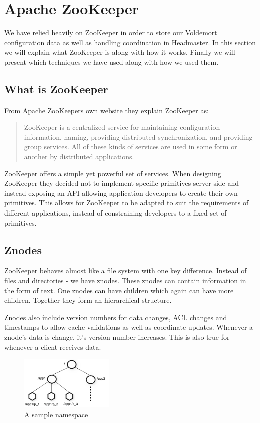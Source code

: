 \clearpage
\section{Apache ZooKeeper}
We have relied heavily on ZooKeeper in order to store our Voldemort configuration data as well as handling coordination in Headmaster. In this section we will explain what ZooKeeper is along with how it works. Finally we will present which techniques we have used along with how we used them. 

\subsection{What is ZooKeeper}
From Apache ZooKeepers own website\cite{zookeeper} they explain ZooKeeper as:

\blockquote{ZooKeeper is a centralized service for maintaining configuration information, naming, providing distributed synchronization, and providing group services. All of these kinds of services are used in some form or another by distributed applications.}

ZooKeeper offers a simple yet powerful set of services. When designing ZooKeeper they decided not to implement specific primitives server side and instead exposing an API allowing application developers to create their own primitives. This allows for ZooKeeper to be adapted to suit the requirements of different applications, instead of constraining developers to a fixed set of primitives. 

\subsection{Znodes}
ZooKeeper behaves almost like a file system with one key difference. Instead of files and directories - we have znodes. These znodes can contain information in the form of text. One znodes can have children which again can have more children. Together they form an hierarchical structure. 

Znodes also include version numbers for data changes, ACL changes and timestamps to allow cache validations as well as coordinate updates. Whenever a znode's data is change, it's version number increases. This is also true for whenever a client receives data. 

\begin{figure}[h]
    \centering
    \includegraphics[width=0.4\textwidth]{software/zknamespace.jpg}
    \caption{A sample namespace}
    \label{fig:zk_namespace}
\end{figure}

